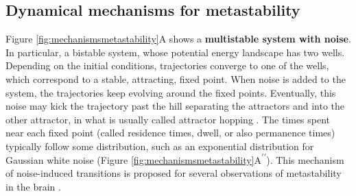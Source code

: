 \documentclass[reprint,onecolumn,superscriptaddress,showpacs,amsmath,amssymb,aps,floatfix]{revtex4-2}
\theoremstyle{definition}
\newcommand{\Emph}[1]{\textbf{#1}}
\newcommand*{\everymodeprime}{\ensuremath{\prime}}
\begin{document}
\subsection*{Dynamical mechanisms for metastability}
Figure \ref{fig:mechanismsmetastability}A shows a \Emph{multistable system with noise}. In particular, a bistable system, whose potential energy landscape has two wells. Depending on the initial conditions, trajectories converge to one of the wells, which correspond to a stable, attracting, fixed point. When noise is added to the system, the trajectories keep evolving around the fixed points. Eventually, this noise may kick the trajectory past the hill separating the attractors and into the other attractor, in what is usually called attractor hopping \cite{kraut2002multistability}. The times spent near each fixed point (called residence times, dwell, or also permanence times) typically follow some distribution, such as an exponential distribution for Gaussian white noise \cite{hanggi1986escape} (Figure \ref{fig:mechanismsmetastability}A\textsuperscript{\everymodeprime\everymodeprime}). This mechanism of noise-induced transitions is proposed for several observations of metastability in the brain \cite{brinkman2022metastable}.
\end{document}
